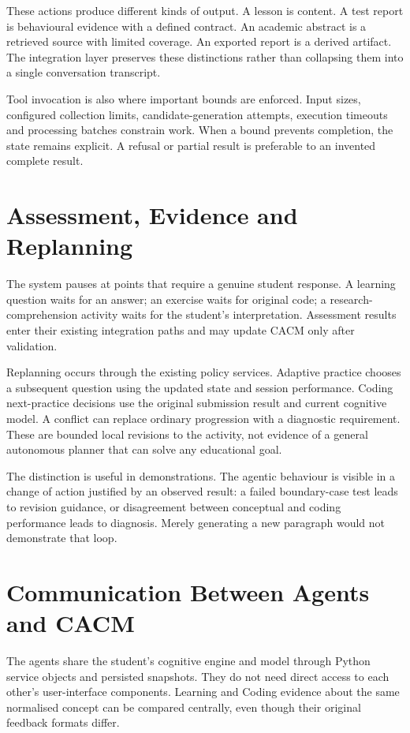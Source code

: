 These actions produce different kinds of output. A lesson is content. A test report is behavioural evidence with a defined contract. An academic abstract is a retrieved source with limited coverage. An exported report is a derived artifact. The integration layer preserves these distinctions rather than collapsing them into a single conversation transcript.

Tool invocation is also where important bounds are enforced. Input sizes, configured collection limits, candidate-generation attempts, execution timeouts and processing batches constrain work. When a bound prevents completion, the state remains explicit. A refusal or partial result is preferable to an invented complete result.

\section{Assessment, Evidence and Replanning}
The system pauses at points that require a genuine student response. A learning question waits for an answer; an exercise waits for original code; a research-comprehension activity waits for the student's interpretation. Assessment results enter their existing integration paths and may update CACM only after validation.

Replanning occurs through the existing policy services. Adaptive practice chooses a subsequent question using the updated state and session performance. Coding next-practice decisions use the original submission result and current cognitive model. A conflict can replace ordinary progression with a diagnostic requirement. These are bounded local revisions to the activity, not evidence of a general autonomous planner that can solve any educational goal.

The distinction is useful in demonstrations. The agentic behaviour is visible in a change of action justified by an observed result: a failed boundary-case test leads to revision guidance, or disagreement between conceptual and coding performance leads to diagnosis. Merely generating a new paragraph would not demonstrate that loop.

\section{Communication Between Agents and CACM}
The agents share the student's cognitive engine and model through Python service objects and persisted snapshots. They do not need direct access to each other's user-interface components. Learning and Coding evidence about the same normalised concept can be compared centrally, even though their original feedback formats differ.


